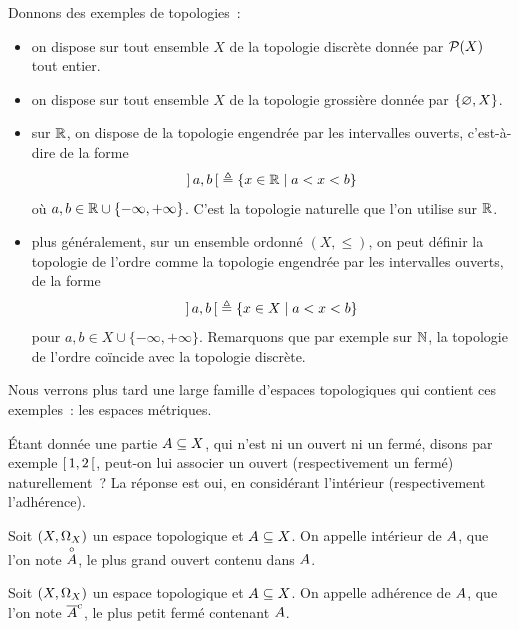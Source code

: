 \begin{example}
  Donnons des exemples de topologies~:
  \begin{itemize}
  \item on dispose sur tout ensemble $X$ de la topologie discrète donnée par
    $\mathcal{P}(X)$ tout entier.
  \item on dispose sur tout ensemble $X$ de la topologie grossière donnée
    par $\{\varnothing,X\}$.
  \item sur $\mathbb R$, on dispose de la topologie engendrée par les
    intervalles ouverts, c'est-à-dire de la forme
    \[\mathord{\left]\,a,b\,\right[} \triangleq \left\{ x \in \mathbb R \;\middle\vert\; a < x < b \right\}\]
    où $a,b\in\mathbb R\cup\{-\infty,+\infty\}$. C'est la topologie naturelle que
    l'on utilise sur $\mathbb R$.
  \item plus généralement, sur un ensemble ordonné $(X,\leq)$, on peut définir
    la topologie de l'ordre comme la topologie engendrée par les intervalles
    ouverts, de la forme
    \[\mathord{\left]\,a,b\,\right[} \triangleq \left\{ x\in X \;\middle\vert\; a < x < b \right\}\]
    pour $a,b\in X\cup\{-\infty,+\infty\}$. Remarquons que par exemple sur
    $\mathbb N$, la topologie de l'ordre coïncide avec la topologie discrète.
  \end{itemize}
\end{example}

\noindent
Nous verrons plus tard une large famille d'espaces topologiques qui contient
ces exemples~: les espaces métriques.

\'Etant donnée une partie $A\subseteq X$, qui n'est ni un ouvert ni un
fermé, disons par exemple $\mathord{\left[\,1,2\,\right[}$, peut-on lui associer
un ouvert (respectivement un fermé) naturellement~? La réponse est oui, en
considérant l'intérieur (respectivement l'adhérence).

\begin{definition}[Intérieur]
  Soit $(X,\Omega_{X})$ un espace topologique et $A\subseteq X$. On appelle
  intérieur de $A$, que l'on note $\overset{\circ}{A}$, le plus grand ouvert
  contenu dans $A$.
\end{definition}

\begin{definition}[Adhérence]
  Soit $(X,\Omega_{X})$ un espace topologique et $A\subseteq X$. On appelle
  adhérence de $A$, que l'on note $\overline{A}^{\mathrm c}$, le plus petit fermé
  contenant $A$.
\end{definition}

